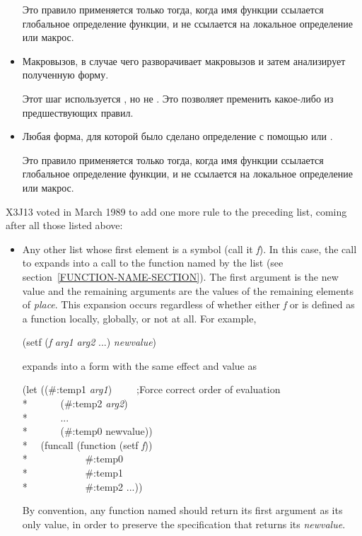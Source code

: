 \begin{defmac}
\begin{itemize}
Это правило применяется только тогда, когда имя функции ссылается глобальное
определение функции, и не ссылается на локальное определение или макрос.

\item 
Макровызов, в случае чего  разворачивает макровызов и затем
анализирует полученную форму.

Этот шаг используется , но не .  Это
позволяет пременить какое-либо из предшествующих правил.

\item 
Любая форма, для которой было сделано определение с помощью  или
.

Это правило применяется только тогда, когда имя функции ссылается глобальное
определение функции, и не ссылается на локальное определение или макрос.
\end{itemize}

\begin{newer}
X3J13 voted in March 1989  to add one more rule to
the preceding list, coming after all those listed above:
\begin{itemize}
\item  Any other list whose first element is a symbol (call it \emph{f\/}).
     In this case, the call to  expands into a call to the function
     named by the
     list  (see section~\ref{FUNCTION-NAME-SECTION}).
     The first argument is the new value and the
     remaining arguments are the values of the remaining elements of
     \emph{place}.  This expansion occurs regardless of whether either \emph{f\/} or
      is defined as a function locally, globally, or not at
     all.  For example,
\begin{lisp}
(setf (\emph{f\/} \emph{arg1} \emph{arg2} ...) \emph{newvalue})
\end{lisp}
     expands into a form with the same effect and value as
\begin{lisp}
(let ((\#:temp1 \emph{arg1})~~~~~;\textrm{Force correct order of evaluation} \\*
~~~~~~(\#:temp2 \emph{arg2}) \\*
~~~~~~... \\*
~~~~~~(\#:temp0 newvalue)) \\*
~~(funcall (function (setf \emph{f\/})) \\*
~~~~~~~~~~~\#:temp0 \\*
~~~~~~~~~~~\#:temp1 \\*
~~~~~~~~~~~\#:temp2 ...))
\end{lisp}
By convention, any function named  should return its first
argument as its only value, in order to preserve the specification that
 returns its \emph{newvalue}.
\end{itemize}
\end{newer}


\end{defmac}
